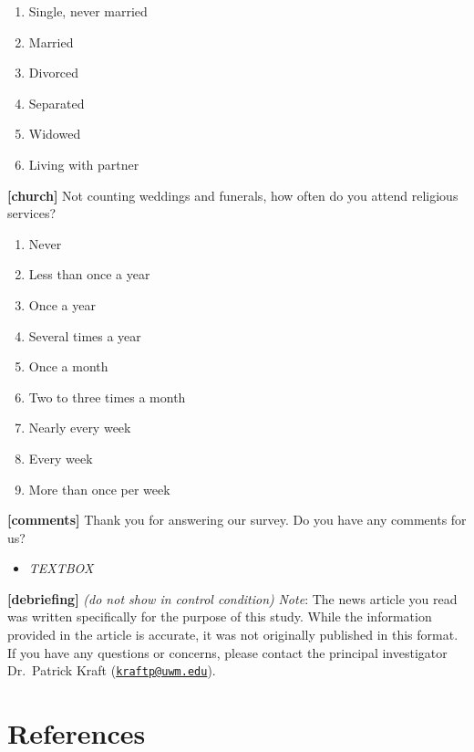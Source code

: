 \documentclass[]{article}
\providecommand{\tightlist}{%
  \setlength{\itemsep}{0pt}\setlength{\parskip}{0pt}}
\begin{document}
\begin{enumerate}
\def\labelenumi{\arabic{enumi}.}
\tightlist
\item
  Single, never married
\item
  Married
\item
  Divorced
\item
  Separated
\item
  Widowed
\item
  Living with partner
\end{enumerate}

\textbf{{[}church{]}} Not counting weddings and funerals, how often do
you attend religious services?

\begin{enumerate}
\def\labelenumi{\arabic{enumi}.}
\tightlist
\item
  Never
\item
  Less than once a year
\item
  Once a year
\item
  Several times a year
\item
  Once a month
\item
  Two to three times a month
\item
  Nearly every week
\item
  Every week
\item
  More than once per week
\end{enumerate}

\textbf{{[}comments{]}} Thank you for answering our survey. Do you have
any comments for us?

\begin{itemize}
\tightlist
\item
  \emph{TEXTBOX}
\end{itemize}

\textbf{{[}debriefing{]}} \emph{(do not show in control condition)}
\emph{Note}: The news article you read was written specifically for the
purpose of this study. While the information provided in the article is
accurate, it was not originally published in this format. If you have
any questions or concerns, please contact the principal investigator
Dr.~Patrick Kraft
(\href{mailto:kraftp@uwm.edu}{\nolinkurl{kraftp@uwm.edu}}).

\hypertarget{references}{%
\section*{References}\label{references}}
\end{document}
